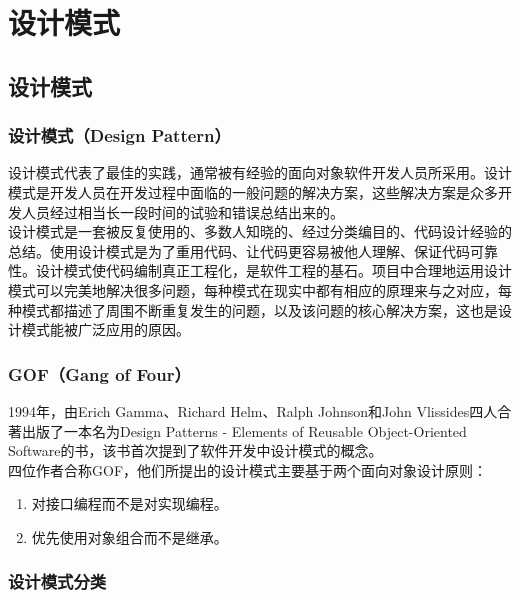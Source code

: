 \chapter{设计模式}

\section{设计模式}

\subsection{设计模式（Design Pattern）}

设计模式代表了最佳的实践，通常被有经验的面向对象软件开发人员所采用。设计模式是开发人员在开发过程中面临的一般问题的解决方案，这些解决方案是众多开发人员经过相当长一段时间的试验和错误总结出来的。\\

设计模式是一套被反复使用的、多数人知晓的、经过分类编目的、代码设计经验的总结。使用设计模式是为了重用代码、让代码更容易被他人理解、保证代码可靠性。设计模式使代码编制真正工程化，是软件工程的基石。项目中合理地运用设计模式可以完美地解决很多问题，每种模式在现实中都有相应的原理来与之对应，每种模式都描述了周围不断重复发生的问题，以及该问题的核心解决方案，这也是设计模式能被广泛应用的原因。\\

\subsection{GOF（Gang of Four）}

1994年，由Erich Gamma、Richard Helm、Ralph Johnson和John Vlissides四人合著出版了一本名为Design Patterns - Elements of Reusable Object-Oriented Software的书，该书首次提到了软件开发中设计模式的概念。\\

四位作者合称GOF，他们所提出的设计模式主要基于两个面向对象设计原则：

\begin{enumerate}
    \item 对接口编程而不是对实现编程。
    \item 优先使用对象组合而不是继承。
\end{enumerate}

\vspace{0.5cm}

\subsection{设计模式分类}


